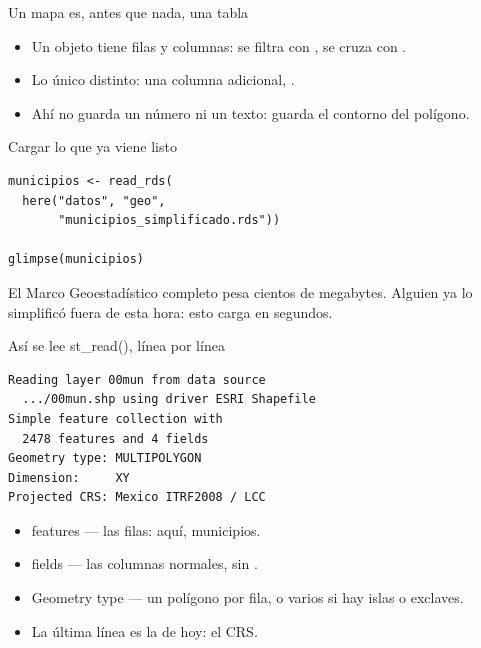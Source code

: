 \begin{frame}{Un mapa es, antes que nada, una tabla}
  \vspace{0.3em}
  \begin{itemize}\setlength{\itemsep}{0.85em}
    \item<1-> Un objeto  tiene filas y columnas: se filtra con
          , se cruza con .
    \item<2-> Lo único distinto: una columna adicional,
          .
    \item<3-> Ahí no guarda un número ni un texto: guarda el contorno
          del polígono.
  \end{itemize}

  \vspace{1.0em}
\end{frame}

\begin{frame}[fragile]{Cargar lo que ya viene listo}
\begin{lstlisting}
municipios <- read_rds(
  here("datos", "geo",
       "municipios_simplificado.rds"))

glimpse(municipios)
\end{lstlisting}

  \vspace{0.6em}
  El Marco Geoestadístico completo pesa cientos de megabytes.
  Alguien ya lo simplificó fuera de esta hora: esto carga en
  segundos.
\end{frame}

\begin{frame}[fragile]{Así se lee st\_read(), línea por línea}
\begin{lstlisting}
Reading layer 00mun from data source
  .../00mun.shp using driver ESRI Shapefile
Simple feature collection with
  2478 features and 4 fields
Geometry type: MULTIPOLYGON
Dimension:     XY
Projected CRS: Mexico ITRF2008 / LCC
\end{lstlisting}

  \vspace{0.4em}
  \begin{itemize}\setlength{\itemsep}{0.55em}
    \item<1-> \ac{features} — las filas: aquí, municipios.
    \item<2-> \ac{fields} — las columnas normales, sin
          .
    \item<3-> \ac{Geometry type} — un polígono por fila, o varios si
          hay islas o exclaves.
    \item<4-> La última línea es la de hoy: el CRS.
  \end{itemize}
\end{frame}

